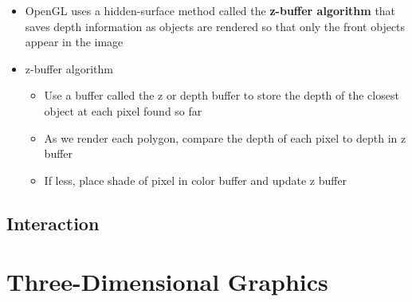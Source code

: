 \documentclass[11pt,a4paper]{article}
\begin{document}
\begin{itemize}
\begin{center}
			\end{center}
			\item OpenGL uses a hidden-surface method called the \textbf{z-buffer algorithm} that saves depth information as objects are rendered so that only the front objects appear in the image
			\item z-buffer algorithm
				\begin{itemize}
					\item Use a buffer called the z or depth buffer to store the depth of the closest object at each pixel found so far
					\item As we render each polygon, compare the depth of each pixel to depth in z buffer
					\item If less, place shade of pixel in color buffer and update z buffer
				\end{itemize}
			

		\end{itemize}
	\subsection{Interaction}
		
\section{Three-Dimensional Graphics}
\end{document}
